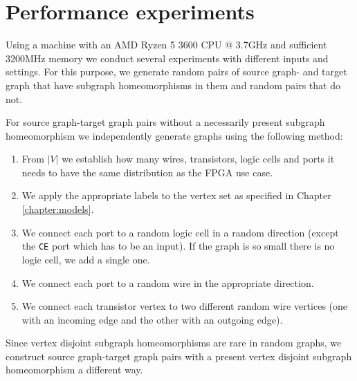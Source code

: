 \chapter{Performance experiments}
Using a machine with an AMD Ryzen 5 3600 CPU @ 3.7GHz and sufficient 3200MHz memory we conduct several experiments with different inputs and settings. For this purpose, we generate random pairs of source graph- and target graph that have subgraph homeomorphisms in them and random pairs that do not.

For source graph-target graph pairs without a necessarily present subgraph homeomorphism we independently generate graphs using the following method:

\begin{enumerate}
\item From $|V|$ we establish how many wires, transistors, logic cells and ports it needs to have the same distribution as the FPGA use case.
\item We apply the appropriate labels to the vertex set as specified in Chapter \ref{chapter:models}.
\item We connect each port to a random logic cell in a random direction (except the \texttt{CE} port which has to be an input). If the graph is so small there is no logic cell, we add a single one.
\item We connect each port to a random wire in the appropriate direction.
\item We connect each transistor vertex to two different random wire vertices (one with an incoming edge and the other with an outgoing edge).
\end{enumerate}

Since vertex disjoint subgraph homeomorphisms are rare in random graphs, we construct source graph-target graph pairs with a present vertex disjoint subgraph homeomorphism a different way.

